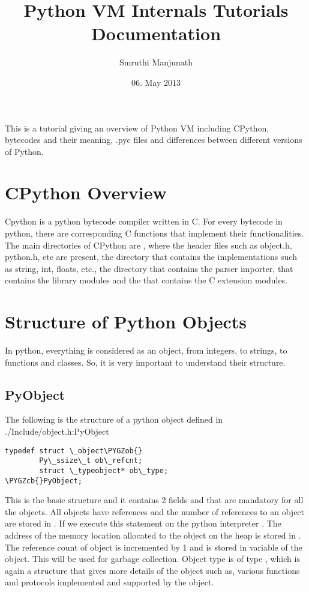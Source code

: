\documentclass[letterpaper,10pt,dutch]{sphinxmanual}
\title{Python VM Internals Tutorials Documentation}
\date{06. May 2013}
\author{Smruthi Manjunath}
\def\PYGZob{\char`\{}
\def\PYGZcb{\char`\}}
\begin{document}
\maketitle
\tableofcontents
{}\label{index::doc}


This is a tutorial giving an overview of Python VM including CPython, bytecodes and their meaning, .pyc files and differences between different versions of Python.


\chapter{CPython Overview}
\label{index:cpython-overview}\label{index:welcome-to-python-vm-internals-tutorial-s-documentation}
Cpython is a python bytecode compiler written in C. For every bytecode in python, there are corresponding C functions that implement their functionalities. The main directories of CPython are , where the header files such as object.h, python.h, etc are present,  the  directory that contains the implementations such as string, int, floats, etc., the  directory that contains the parser importer,  that contains the library modules and the  that contains the C extension modules.


\chapter{Structure of Python Objects}
\label{index:structure-of-python-objects}
In python, everything is considered as an object, from integers, to strings, to functions and classes. So, it is very important to understand their structure.


\section{PyObject}
\label{index:pyobject}
The following is the structure of a python object defined in ./Include/object.h:PyObject

\begin{Verbatim}[commandchars=\\\{\}]
typedef struct \_object\PYGZob{}
        Py\_ssize\_t ob\_refcnt;
        struct \_typeobject* ob\_type;
\PYGZcb{}PyObject;
\end{Verbatim}

This is the basic structure and it contains 2 fields  and  that are mandatory for all the objects. All objects have references and the number of references to an object are stored in . If we execute this statement on the python interpreter . The address of the memory location allocated to the object on the heap is stored in . The reference count of object is incremented by 1 and is stored in  variable of the object. This will be used for garbage collection. Object type is of type , which is again a structure that gives more details of the object such as, various functions and protocols implemented and supported by the object.
\end{document}
